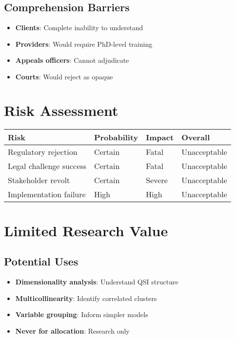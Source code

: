 \subsection{Comprehension Barriers}

\begin{itemize}
    \item \textbf{Clients}: Complete inability to understand
    \item \textbf{Providers}: Would require PhD-level training
    \item \textbf{Appeals officers}: Cannot adjudicate
    \item \textbf{Courts}: Would reject as opaque
\end{itemize}

\section{Risk Assessment}

\begin{center}
\begin{tabular}{llll}
\toprule
Risk & Probability & Impact & Overall \\
\midrule
Regulatory rejection & Certain & Fatal & Unacceptable \\
Legal challenge success & Certain & Fatal & Unacceptable \\
Stakeholder revolt & Certain & Severe & Unacceptable \\
Implementation failure & High & High & Unacceptable \\
\bottomrule
\end{tabular}
\end{center}

\section{Limited Research Value}

\subsection{Potential Uses}

\begin{itemize}
    \item \textbf{Dimensionality analysis}: Understand QSI structure
    \item \textbf{Multicollinearity}: Identify correlated clusters
    \item \textbf{Variable grouping}: Inform simpler models
    \item \textbf{Never for allocation}: Research only
\end{itemize}

